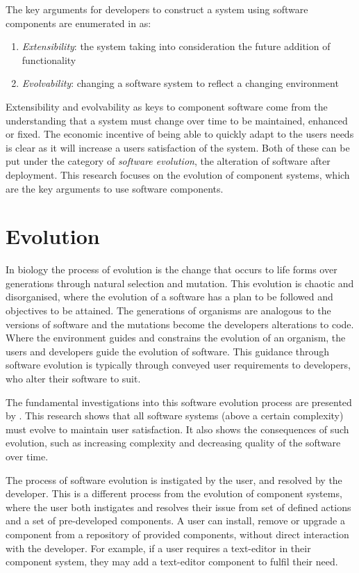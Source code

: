 The key arguments for developers to construct a system using software components are enumerated in \cite{Szyperski2000} as:
\begin{enumerate}
	\item \textit{Extensibility}: the system taking into consideration the future addition of functionality
	\item \textit{Evolvability}: changing a software system to reflect a changing environment
\end{enumerate}

Extensibility and evolvability as keys to component software come from the understanding that a system must change over time to be maintained, enhanced or fixed.
The economic incentive of being able to quickly adapt to the users needs is clear as it will increase a users satisfaction of the system.
Both of these can be put under the category of \textit{software evolution}, the alteration of software after deployment.
This research focuses on the evolution of component systems, which are the key arguments to use software components.

\section{Evolution}
In biology the process of evolution is the change that occurs to life forms over generations through natural selection and mutation.
This evolution is chaotic and disorganised, where the evolution of a software has a plan to be followed and objectives to be attained.
The generations of organisms are analogous to the versions of software and the mutations become the developers alterations to code.
Where the environment guides and constrains the evolution of an organism, the users and developers guide the evolution of software.
This guidance through software evolution is typically through conveyed user requirements to developers, who alter their software to suit.

The fundamental investigations into this software evolution process are presented by \cite{lehman1980}.
This research shows that all software systems (above a certain complexity) must evolve to maintain user satisfaction.
It also shows the consequences of such evolution, such as increasing complexity and decreasing quality of the software over time.

The process of software evolution is instigated by the user, and resolved by the developer.
This is a different process from the evolution of component systems, 
where the user both instigates and resolves their issue from set of defined actions and a set of pre-developed components.
A user can install, remove or upgrade a component from a repository of provided components, without direct interaction with the developer. 
For example, if a user requires a text-editor in their component system, they may add a text-editor component to fulfil their need.

